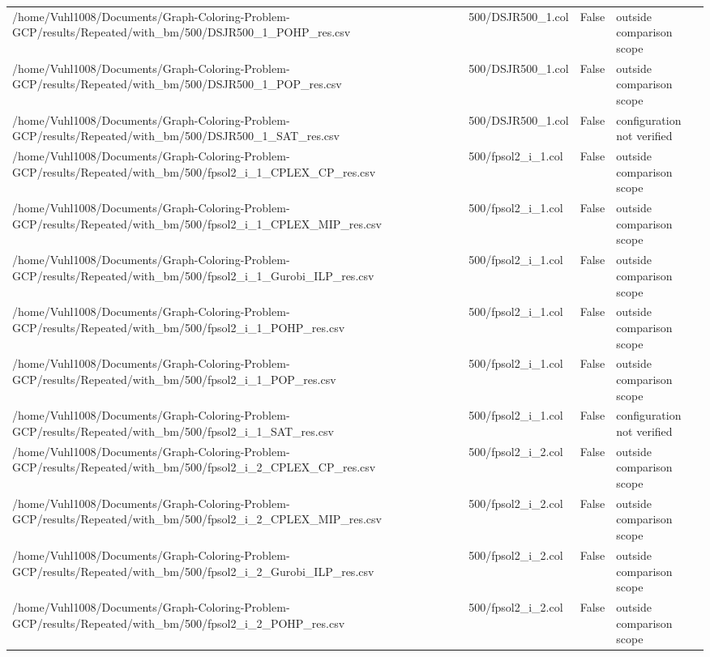 \begin{table}[htbp]
\begin{tabular}{llll}
/home/Vuhl1008/Documents/Graph-Coloring-Problem-GCP/results/Repeated/with\_bm/500/DSJR500\_1\_POHP\_res.csv & 500/DSJR500\_1.col & False & outside comparison scope \\
/home/Vuhl1008/Documents/Graph-Coloring-Problem-GCP/results/Repeated/with\_bm/500/DSJR500\_1\_POP\_res.csv & 500/DSJR500\_1.col & False & outside comparison scope \\
/home/Vuhl1008/Documents/Graph-Coloring-Problem-GCP/results/Repeated/with\_bm/500/DSJR500\_1\_SAT\_res.csv & 500/DSJR500\_1.col & False & configuration not verified \\
/home/Vuhl1008/Documents/Graph-Coloring-Problem-GCP/results/Repeated/with\_bm/500/fpsol2\_i\_1\_CPLEX\_CP\_res.csv & 500/fpsol2\_i\_1.col & False & outside comparison scope \\
/home/Vuhl1008/Documents/Graph-Coloring-Problem-GCP/results/Repeated/with\_bm/500/fpsol2\_i\_1\_CPLEX\_MIP\_res.csv & 500/fpsol2\_i\_1.col & False & outside comparison scope \\
/home/Vuhl1008/Documents/Graph-Coloring-Problem-GCP/results/Repeated/with\_bm/500/fpsol2\_i\_1\_Gurobi\_ILP\_res.csv & 500/fpsol2\_i\_1.col & False & outside comparison scope \\
/home/Vuhl1008/Documents/Graph-Coloring-Problem-GCP/results/Repeated/with\_bm/500/fpsol2\_i\_1\_POHP\_res.csv & 500/fpsol2\_i\_1.col & False & outside comparison scope \\
/home/Vuhl1008/Documents/Graph-Coloring-Problem-GCP/results/Repeated/with\_bm/500/fpsol2\_i\_1\_POP\_res.csv & 500/fpsol2\_i\_1.col & False & outside comparison scope \\
/home/Vuhl1008/Documents/Graph-Coloring-Problem-GCP/results/Repeated/with\_bm/500/fpsol2\_i\_1\_SAT\_res.csv & 500/fpsol2\_i\_1.col & False & configuration not verified \\
/home/Vuhl1008/Documents/Graph-Coloring-Problem-GCP/results/Repeated/with\_bm/500/fpsol2\_i\_2\_CPLEX\_CP\_res.csv & 500/fpsol2\_i\_2.col & False & outside comparison scope \\
/home/Vuhl1008/Documents/Graph-Coloring-Problem-GCP/results/Repeated/with\_bm/500/fpsol2\_i\_2\_CPLEX\_MIP\_res.csv & 500/fpsol2\_i\_2.col & False & outside comparison scope \\
/home/Vuhl1008/Documents/Graph-Coloring-Problem-GCP/results/Repeated/with\_bm/500/fpsol2\_i\_2\_Gurobi\_ILP\_res.csv & 500/fpsol2\_i\_2.col & False & outside comparison scope \\
/home/Vuhl1008/Documents/Graph-Coloring-Problem-GCP/results/Repeated/with\_bm/500/fpsol2\_i\_2\_POHP\_res.csv & 500/fpsol2\_i\_2.col & False & outside comparison scope \\

\end{tabular}
\end{table}
